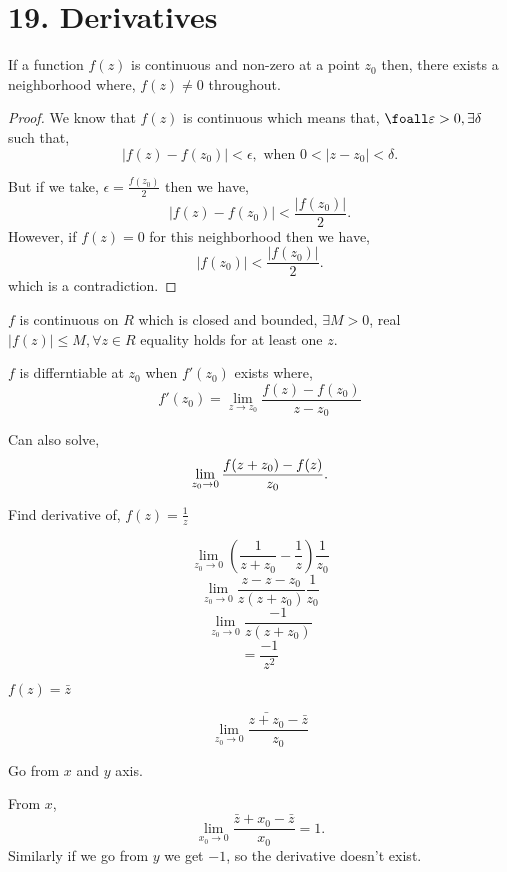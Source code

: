 \section{19. Derivatives}
\begin{theorem}
   If a function $f(z)$ is continuous and non-zero at a point $z_0$ then, there exists a neighborhood where, $f(z) \neq 0$ throughout.
\end{theorem}
\begin{proof}
   
   We know that $f(z)$ is continuous which means that, $\foall \epsilon > 0, \exists \delta$ such that,  \[
      |f(z) - f(z_0)| < \epsilon, \text{ when } 0 < |z - z_0| < \delta
   .\] 

   But if we take, $\epsilon = \frac{f(z_0)}{2}$ then we have, \[
   |f(z) - f(z_0)| < \frac{|f(z_0)|}{2}
   .\] 
   However, if $f(z) = 0$ for this neighborhood then we have,  \[
   |f(z_0)|  < \frac{|f(z_0)|}{2}
   .\] 
   which is a contradiction.



\end{proof}

\begin{theorem}
   $f$ is continuous on $R$ which is closed and bounded, $\exists M > 0$, real $|f(z)| \leq M, \forall z \in R$  equality holds for at least one  $z$.
\end{theorem}


\begin{definition}[Derivative]
   $f$ is differntiable at $z_0$ when $f'(z_0)$ exists where, 
   $$f'(z_0) = \lim_{z \to z_0} \frac{f(z) - f(z_0)}{z-z_0}$$
\end{definition}
\begin{remark}
   Can also solve, \[
   \lim_{z_0 \to 0} \frac{f(z + z_0) - f(z)}{z_0}$$
   .\] 
\end{remark}

\begin{eg}
   Find derivative of, $f(z) = \frac{1}{z}$

   $$\lim_{z_0 \to 0} (\frac{1}{z + z_0} - \frac{1}{z}) \frac{1}{z_0}$$
   $$\lim_{z_0 \to 0} \frac{z - z - z_0}{z(z + z_0)} \frac{1}{z_0}$$
   $$\lim_{z_0 \to 0} \frac{-1}{z(z + z_0)}$$
   $$= \frac{-1}{z^2}$$
\end{eg}
\begin{eg}
   $f(z) = \bar z$

   $$\lim_{z_0 \to 0} \frac{\bar{z + z_0} - \bar z}{z_0}$$

   Go from $x$ and  $y$ axis.

   From $x$,  \[
   \lim_{x_0 \to 0} \frac{\bar z + x_0 - \bar z}{x_0}
   =1
   .\] 
   Similarly if we go from $y$ we get  $-1$, so the derivative doesn't exist.


\end{eg}

